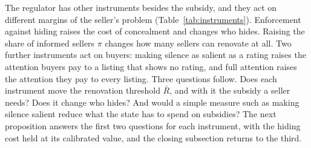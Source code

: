 The regulator has other instruments besides the subsidy, and they act on different margins of the seller's problem (Table~\ref{tab:instruments}). Enforcement against hiding raises the cost of concealment and changes who hides. Raising the share of informed sellers $\pi$ changes how many sellers can renovate at all. Two further instruments act on buyers: making silence as salient as a rating raises the attention buyers pay to a listing that shows no rating, and full attention raises the attention they pay to every listing. Three questions follow. Does each instrument move the renovation threshold $\bar R$, and with it the subsidy a seller needs? Does it change who hides? And would a simple measure such as making silence salient reduce what the state has to spend on subsidies? The next proposition answers the first two questions for each instrument, with the hiding cost held at its calibrated value, and the closing subsection returns to the third.
